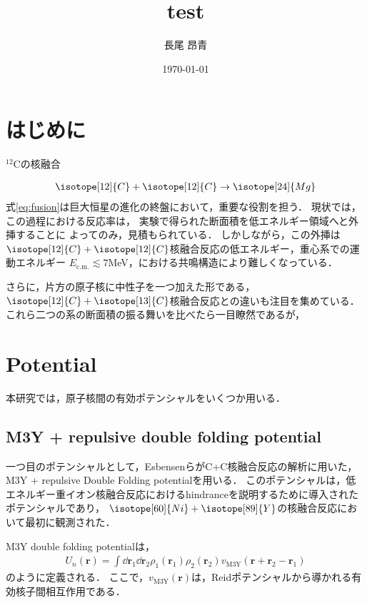 \documentclass[a4paper,11pt]{ltjsarticle}
\begin{document}
\title{test}
\author{長尾 昂青}
\date{\today}
\maketitle

\tableofcontents

\newpage
\section{はじめに}

$^{12}$Cの核融合

\begin{align}\label{eq:fusion}
  \isotope[12]{C} + \isotope[12]{C} \rightarrow  \isotope[24]{Mg}
\end{align}
式\ref{eq:fusion}は巨大恒星の進化の終盤において，重要な役割を担う．
現状では，この過程における反応率は，
実験で得られた断面積を低エネルギー領域へと外挿することに
よってのみ，見積もられている．
しかしながら，この外挿は$\isotope[12]{C} + \isotope[12]{C}$核融合反応の低エネルギー，重心系での運動エネルギー
$E_\text{c.m.} \lesssim 7$MeV，における共鳴構造により難しくなっている．

さらに，片方の原子核に中性子を一つ加えた形である，$\isotope[12]{C} + \isotope[13]{C}$核融合反応との違いも注目を集めている．
これら二つの系の断面積の振る舞いを比べたら一目瞭然であるが，

\section{Potential}

本研究では，原子核間の有効ポテンシャルをいくつか用いる．
\subsection{M3Y + repulsive double folding potential}
一つ目のポテンシャルとして，Esbensenら\cite{Esbensen2011}がC+C核融合反応の解析に用いた，M3Y + repulsive Double Folding potentialを用いる．
このポテンシャルは，低エネルギー重イオン核融合反応におけるhindranceを説明するために導入されたポテンシャル\cite{PhysRevC.75.034606}であり，
$\isotope[60]{Ni} + \isotope[89]{Y}$の核融合反応において最初に観測された\cite{PhysRevLett.89.052701}．

M3Y double folding potentialは，
\begin{align}
  U_n (\bm{r}) = \int \dd{\bm{r}_1} \dd{\bm{r}_2} \rho_1(\bm{r}_1) \rho_2(\bm{r}_2) v_\mathrm{M3Y} (\bm{r} + \bm{r}_2 - \bm{r}_1)
\end{align}
のように定義される．
ここで，$v_\mathrm{M3Y}(\bm{r})$は，Reidポテンシャルから導かれる有効核子間相互作用である．

% 
% 
\printbibliography%
\end{document}

